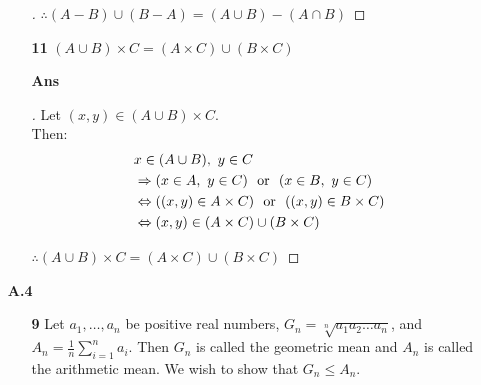 \documentclass[paper=usletter, fontsize=12pt]{article}
\begin{document}
\begin{itemize}
\begin{itemize}
\begin{proof}[\unskip\nopunct]
                    $\therefore (A - B) \cup (B - A) = (A \cup B) - (A \cap B)$
                    \qedhere
                \end{proof}
                \vspace{0.2in}

                \item[\textbf{11}] $(A \cup B) \times C = (A \times C) \cup (B
                \times C)$
                \item[\textbf{Ans}]
                \begin{proof}[\unskip\nopunct]
                    Let $(x,y) \in (A \cup B) \times C$. \\
                    Then:
                    \begin{align*}
                        & x \in (A \cup B), \ y \in C \\
                        & \Rightarrow (x \in A, \ y \in C) \text{ \ or \ } (x
                        \in B, \ y \in C) \\
                        & \Leftrightarrow ((x, y) \in A \times C) \text{ \ or \
                        } ((x, y) \in B \times C) \\
                        & \Leftrightarrow (x, y) \in (A \times C) \cup (B
                        \times C)
                    \end{align*}

                $\therefore (A \cup B) \times C = (A \times C) \cup (B \times
                C)$ \qedhere
                \end{proof}
                \vspace{0.2in}

            \end{itemize}

        \item[\textbf{A.4}]

        \begin{itemize}

            \item[\textbf{9}] Let $a_1, \ldots, a_n$ be positive real numbers,
            $G_n = \sqrt[n]{a_{1}a_{2}\ldots a_{n}}$, and $A_n =
            \frac{1}{n}\sum_{i=1}^{n}a_i$. Then $G_n$ is called the geometric
            mean and $A_n$ is called the arithmetic mean. We wish to show that
            $G_n \le A_n$.

            \begin{enumerate}


\end{enumerate}
\end{itemize}
\end{itemize}
\end{document}
